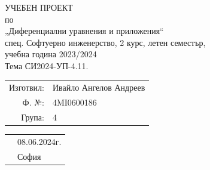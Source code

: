 \documentclass[11pt]{article}
\begin{document}
\begin{center}
    {\huge УЧЕБЕН ПРОЕКТ} \\
    по \\
    {\huge „Диференциални уравнения и приложения“} \\
    спец. Софтуерно инженерство, 2 курс, летен семестър,  \\
    учебна година 2023/2024 \\
    Тема СИ2024-УП-4.11. \\
    \vspace{0.5cm}
\end{center}

\begin{flushright}
    \begin{tabular}{rl}
        Изготвил: & Ивайло Ангелов Андреев \\
        Ф. №:     & 4MI0600186 \\
        Група:    & 4 \\
    \end{tabular}
\end{flushright}

\begin{flushleft}
    \begin{tabular}{rl}
        & 08.06.2024г. \\
        & София \\
    \end{tabular}
\end{flushleft}

\newpage
\tableofcontents
\newpage
\end{document}
